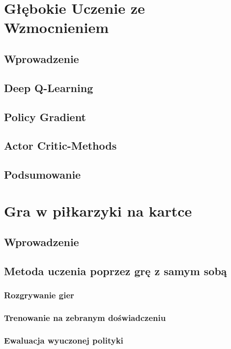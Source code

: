 \documentclass[licencjacka]{pracamgr}
\begin{document}
\chapter{Głębokie Uczenie ze Wzmocnieniem}

\section{Wprowadzenie}

\section{Deep Q-Learning}

\section{Policy Gradient}

\section{Actor Critic-Methods}

\section{Podsumowanie}

\chapter{Gra w piłkarzyki na kartce}

\section{Wprowadzenie}

\section{Metoda uczenia poprzez grę z samym sobą}

\subsection{Rozgrywanie gier}

\subsection{Trenowanie na zebranym doświadczeniu}

\subsection{Ewaluacja wyuczonej polityki}
\end{document}
